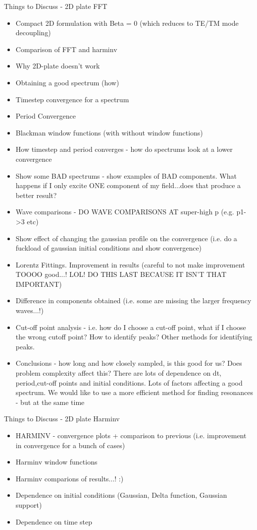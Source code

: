 Things to Discuss - 2D plate FFT
\begin{itemize}
\item Compact 2D formulation with Beta = 0 (which reduces to TE/TM mode decoupling)
\item Comparison of FFT and harminv
\item Why 2D-plate doesn't work
\item Obtaining a good spectrum (how)
\item Timestep convergence for a spectrum
\item Period Convergence
\item Blackman window functions (with without window functions)
\item How timestep and period converges - how do spectrums look at a lower convergence
\item Show some BAD spectrums - show examples of BAD components. What happens if I only excite ONE component of my field...does that produce a better result?
\item Wave comparisons - DO WAVE COMPARISONS AT super-high p (e.g. p1->3 etc)
\item Show effect of changing the gaussian profile on the convergence (i.e. do a fuckload of gaussian initial conditions and show convergence)
\item Lorentz Fittings. Improvement in results (careful to not make improvement TOOOO good...! LOL! DO THIS LAST BECAUSE IT ISN'T THAT IMPORTANT)
\item Difference in components obtained (i.e. some are missing the larger frequency waves...!)
\item Cut-off point analysis - i.e. how do I choose a cut-off point, what if I choose the wrong cutoff point? How to identify peaks? Other methods for identifying peaks.
\item Conclusions - how long and how closely sampled, is this good for us? Does problem complexity affect this? There are lots of dependence on dt, period,cut-off points and initial conditions. Lots of factors affecting a good spectrum. We would like to use a more efficient method for finding resonances - but at the same time
\end{itemize}

Things to Discuss - 2D plate Harminv
\begin{itemize}
\item HARMINV - convergence plots + comparison to previous (i.e. improvement in convergence for a bunch of cases)
\item Harminv window functions
\item Harminv comparions of results...! :)
\item Dependence on initial conditions (Gaussian, Delta function, Gaussian support)
\item Dependence on time step
\end{itemize}

